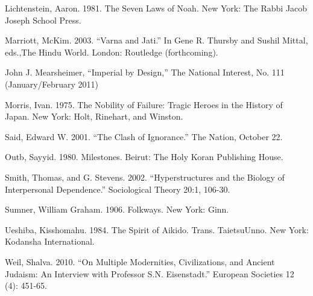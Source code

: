 \begin{list}{}{}
\item Lichtenstein, Aaron. 1981. The Seven Laws of Noah. New York: The Rabbi Jacob Joseph School Press.
\item Marriott, McKim. 2003. ``Varna and Jati.'' In Gene R. Thursby and Sushil Mittal, eds.,The Hindu World. London: Routledge (forthcoming).
\item John J. Mearsheimer, ``Imperial by Design,'' The National Interest, No. 111 (January/February 2011)
\item Morris, Ivan. 1975. The Nobility of Failure: Tragic Heroes in the History of Japan. New York: Holt, Rinehart, and Winston.
\item Said, Edward W. 2001. ``The Clash of Ignorance.'' The Nation, October 22.
\item Outb, Sayyid. 1980. Milestones. Beirut: The Holy Koran Publishing House.
\item Smith, Thomas, and G. Stevens. 2002. ``Hyperstructures and the Biology of Interpersonal Dependence.'' Sociological Theory 20:1, 106-30.
\item Sumner, William Graham. 1906. Folkways. New York: Ginn.
\item Ueshiba, Kisshomahu. 1984. The Spirit of Aikido. Trans. TaietsuUnno. New York: Kodansha International.
\item Weil, Shalva. 2010. ``On Multiple Modernities, Civilizations, and Ancient Judaism: An Interview with Professor S.N. Eisenstadt.'' European Societies 12 (4): 451-65.
\end{list}